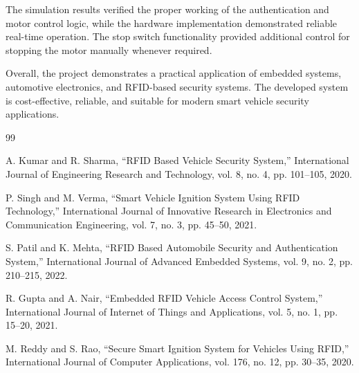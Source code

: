 \documentclass[12pt,a4paper,oneside]{report}
\begin{document}
The simulation results verified the proper working of the authentication and motor control logic, while the hardware implementation demonstrated reliable real-time operation. The stop switch functionality provided additional control for stopping the motor manually whenever required.

Overall, the project demonstrates a practical application of embedded systems, automotive electronics, and RFID-based security systems. The developed system is cost-effective, reliable, and suitable for modern smart vehicle security applications.

\begin{thebibliography}{99}

A. Kumar and R. Sharma, “RFID Based Vehicle Security System,” International Journal of Engineering Research and Technology, vol. 8, no. 4, pp. 101--105, 2020.

P. Singh and M. Verma, “Smart Vehicle Ignition System Using RFID Technology,” International Journal of Innovative Research in Electronics and Communication Engineering, vol. 7, no. 3, pp. 45--50, 2021.

S. Patil and K. Mehta, “RFID Based Automobile Security and Authentication System,” International Journal of Advanced Embedded Systems, vol. 9, no. 2, pp. 210--215, 2022.

R. Gupta and A. Nair, “Embedded RFID Vehicle Access Control System,” International Journal of Internet of Things and Applications, vol. 5, no. 1, pp. 15--20, 2021.

M. Reddy and S. Rao, “Secure Smart Ignition System for Vehicles Using RFID,” International Journal of Computer Applications, vol. 176, no. 12, pp. 30--35, 2020.

\end{thebibliography}
\end{document}
